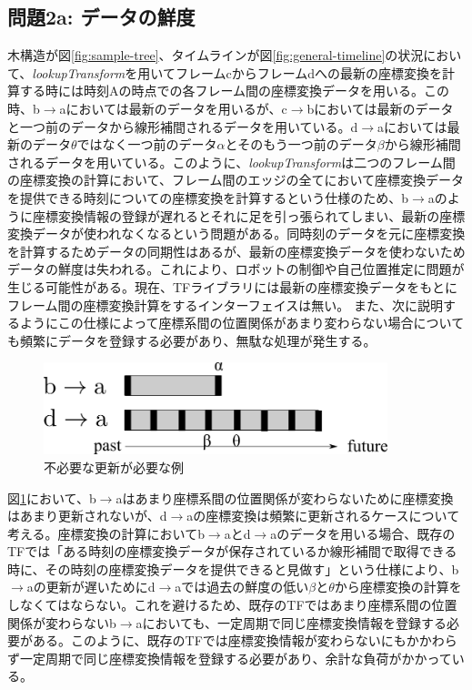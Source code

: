 \documentclass[a4paper]{jreport}	%
\begin{document}
\subsection*{問題2a: データの鮮度}
\label{section:prob-2a}
木構造が図\ref{fig:sample-tree}、タイムラインが図\ref{fig:general-timeline}の状況において、\textit{lookupTransform}を用いてフレームcからフレームdへの最新の座標変換を計算する時には時刻Aの時点での各フレーム間の座標変換データを用いる。この時、b$\rightarrow$aにおいては最新のデータを用いるが、c$\rightarrow$bにおいては最新のデータと一つ前のデータから線形補間されるデータを用いている。d$\rightarrow$aにおいては最新のデータ$\theta$ではなく一つ前のデータ$\alpha$とそのもう一つ前のデータ$\beta$から線形補間されるデータを用いている。このように、\textit{lookupTransform}は二つのフレーム間の座標変換の計算において、フレーム間のエッジの全てにおいて座標変換データを提供できる時刻についての座標変換を計算するという仕様のため、b$\rightarrow$aのように座標変換情報の登録が遅れるとそれに足を引っ張られてしまい、最新の座標変換データが使われなくなるという問題がある。同時刻のデータを元に座標変換を計算するためデータの同期性はあるが、最新の座標変換データを使わないためデータの鮮度は失われる。これにより、ロボットの制御や自己位置推定に問題が生じる可能性がある。現在、TFライブラリには最新の座標変換データをもとにフレーム間の座標変換計算をするインターフェイスは無い。
また、次に説明するようにこの仕様によって座標系間の位置関係があまり変わらない場合についても頻繁にデータを登録する必要があり、無駄な処理が発生する。

\begin{figure}[h] 
\centering
\includegraphics[width=10cm]{need-many-update}
\caption{不必要な更新が必要な例}
\label{fig:need-many-update}
\end{figure}

図\ref{fig:need-many-update}において、b$\rightarrow$aはあまり座標系間の位置関係が変わらないために座標変換はあまり更新されないが、d$\rightarrow$aの座標変換は頻繁に更新されるケースについて考える。座標変換の計算においてb$\rightarrow$aとd$\rightarrow$aのデータを用いる場合、既存のTFでは「ある時刻の座標変換データが保存されているか線形補間で取得できる時に、その時刻の座標変換データを提供できると見做す」という仕様により、b$\rightarrow$aの更新が遅いためにd$\rightarrow$aでは過去の鮮度の低い$\beta$と$\theta$から座標変換の計算をしなくてはならない。これを避けるため、既存のTFではあまり座標系間の位置関係が変わらないb$\rightarrow$aにおいても、一定周期で同じ座標変換情報を登録する必要がある。このように、既存のTFでは座標変換情報が変わらないにもかかわらず一定周期で同じ座標変換情報を登録する必要があり、余計な負荷がかかっている。
\end{document}
